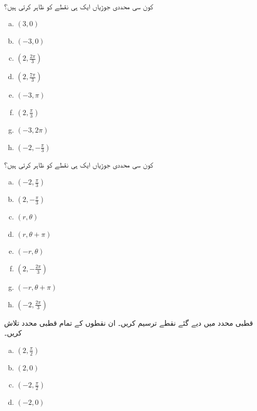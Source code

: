 \\
کون سی محددی جوڑیاں ایک ہی نقطے  کو ظاہر کرتی ہیں؟\\
\begin{multicols}{4}
\begin{enumerate}[a.]
\item
$(3,0)$
\item
$(-3,0)$
\item
$(2,\tfrac{2\pi}{3})$
\item
$(2,\tfrac{7\pi}{3})$
\item
$(-3,\pi)$
\item
$(2,\tfrac{\pi}{3})$
\item
$(-3,2\pi)$
\item
$(-2,-\tfrac{\pi}{3})$
\end{enumerate}
\end{multicols}
کون سی محددی جوڑیاں ایک ہی نقطے  کو ظاہر کرتی ہیں؟\\
\begin{multicols}{4}
\begin{enumerate}[a.]
\item
$(-2,\tfrac{\pi}{3})$
\item
$(2,-\tfrac{\pi}{3})$
\item
$(r,\theta)$
\item
$(r,\theta+\pi)$
\item
$(-r,\theta)$
\item
$(2,-\tfrac{2\pi}{3})$
\item
$(-r,\theta+\pi)$
\item
$(-2,\tfrac{2\pi}{3})$
\end{enumerate}
\end{multicols}
قطبی محدد میں دیے گئے نقطے ترسیم کریں۔ ان نقطوں کے تمام قطبی محدد تلاش کریں۔ 
\begin{multicols}{4}
\begin{enumerate}[a.]
\item
$(2,\tfrac{\pi}{2})$
\item
$(2,0)$
\item
$(-2,\tfrac{\pi}{2})$
\item
$(-2,0)$
\end{enumerate}
\end{multicols}
